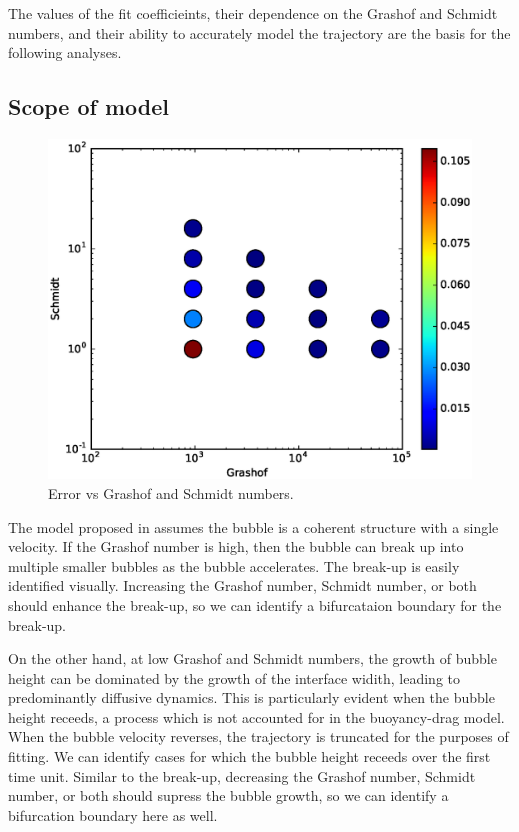 The values of the fit coefficieints, their dependence on the Grashof and Schmidt numbers, and their ability to accurately model the trajectory are the basis for the following analyses.

\subsection{Scope of model}

\begin{figure}
\includegraphics[width=\columnwidth]{figs/Err-vs-Gr-Sc}
\caption{ 
  Error vs Grashof and Schmidt numbers.
}
\end{figure}

The model proposed in  assumes the bubble is a coherent structure with a single velocity.
If the Grashof number is high, then the bubble can break up into multiple smaller bubbles as the bubble accelerates.
The break-up is easily identified visually.
Increasing the Grashof number, Schmidt number, or both should enhance the break-up, so we can identify a bifurcataion boundary for the break-up.

On the other hand, at low Grashof and Schmidt numbers, the growth of bubble height can be dominated by the growth of the interface widith, leading to predominantly diffusive dynamics.
This is particularly evident when the bubble height receeds, a process which is not accounted for in the buoyancy-drag model.
When the bubble velocity reverses, the trajectory is truncated for the purposes of fitting.
We can identify cases for which the bubble height receeds over the first time unit.
Similar to the break-up, decreasing the Grashof number, Schmidt number, or both should supress the bubble growth, so we can identify a bifurcation boundary here as well.

